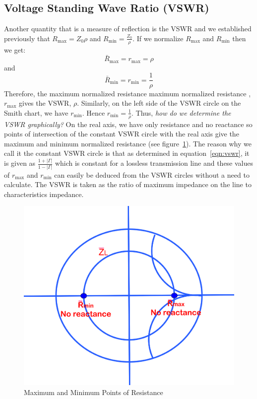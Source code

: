 \subsection{Voltage Standing Wave Ratio (VSWR)}
Another quantity that is a measure of reflection is the VSWR and we established previously that $R_\max = Z_0\rho$ and $R_\min = \frac{Z_0}{\rho}$. If we normalize $R_\max$ and $R_\min$ then we get:
\begin{equation}
\bar{R}_\max = r_\max = {\rho}
\end{equation}
and
\begin{equation}
\bar{R}_\min = r_\min = \frac{1}{\rho}
\end{equation}
Therefore, the maximum normalized resistance maximum normalized resistance , $r_\max$ gives the VSWR, $\rho$. Similarly, on the left side of the VSWR circle on the Smith chart, we have $r_\min$. Hence $r_\min = \frac{1}{\rho}$. Thus, \emph{how do we determine the VSWR graphically?} On the real axis, we have only resistance and no reactance so points of intersection of the constant VSWR circle with the real axis give the maximum and minimum normalized resistance (see figure~\ref{fig:oijhgfdsa}). The reason why we call it the constant VSWR circle is that as determined in equation~\eqref{eqn:vswr}, it is given as $\frac{1 + |\Gamma|}{1 - |\Gamma|}$ which is constant for a lossless transmission line and these values of $r_\max$ and $r_\min$ can easily be deduced from the VSWR circles without a need to calculate. The VSWR is taken as the ratio of maximum impedance on the line to characteristics impedance.
\begin{figure}[h]
\centering
\includegraphics[width=0.7\linewidth]{graphics/oijhgfdsa}
\caption{Maximum and Minimum Points of Resistance}
\label{fig:oijhgfdsa}
\end{figure}

